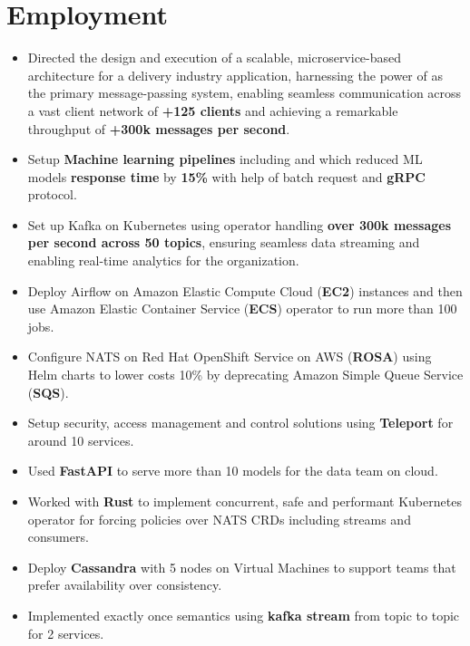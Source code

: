 \section{Employment}

\begin{itemize}
      \item Directed the design and execution of a scalable, microservice-based architecture for a delivery industry application, harnessing the power of  as the primary message-passing system, enabling seamless communication across a vast client network of \textbf{+125 clients} and achieving a remarkable throughput of \textbf{+300k messages per second}.
      \item Setup \textbf{Machine learning pipelines} including  and
             which reduced ML models \textbf{response time} by \textbf{15\%}
            with help of batch request and \textbf{gRPC} protocol.
      \item Set up Kafka on Kubernetes using  operator handling \textbf{over 300k messages per second across 50 topics}, ensuring seamless data streaming and enabling real-time analytics for the organization.
      \item Deploy Airflow on Amazon Elastic Compute Cloud (\textbf{EC2}) instances and then use
            Amazon Elastic Container Service (\textbf{ECS}) operator
            to run more than 100 jobs.
      \item Configure NATS on Red Hat OpenShift Service on AWS (\textbf{ROSA})
            using Helm charts to lower costs 10\% by deprecating Amazon Simple Queue Service (\textbf{SQS}).
      \item Setup security, access management and control solutions using \textbf{Teleport} for around 10 services.
      \item Used \textbf{FastAPI} to serve more than 10 models for the data team on cloud.
      \item Worked with \textbf{Rust} to implement concurrent, safe and performant Kubernetes operator for forcing
            policies over NATS CRDs including streams and consumers.
      \item Deploy \textbf{Cassandra} with 5 nodes on Virtual Machines to support teams that prefer availability over consistency.
      \item Implemented exactly once semantics using \textbf{kafka stream} from topic to topic for 2 services.
\end{itemize}

